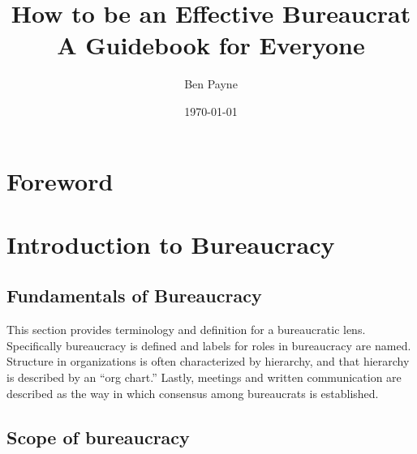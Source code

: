 \documentclass{book}
\title{How to be an Effective Bureaucrat\\
A Guidebook for Everyone}
\author{Ben Payne}
\date{\today}
\begin{document}
\begin{titlepage}
\maketitle
\thispagestyle{empty}
\end{titlepage}
\newpage

\frontmatter %

\clearpage

\chapter*{Foreword}%


\tableofcontents

\mainmatter %



\chapter{Introduction to Bureaucracy}

\section{Fundamentals of Bureaucracy\label{fundamentals_of_b}}
This section provides terminology and definition for a bureaucratic lens. Specifically bureaucracy is defined and labels for roles in bureaucracy are named. Structure in organizations is often characterized by hierarchy, and that hierarchy is described by an ``org chart.'' Lastly, meetings and written communication are described as the way in which consensus among bureaucrats is established.







\section{Scope of bureaucracy}

\end{document}

